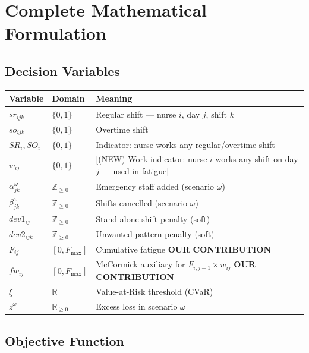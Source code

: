 \documentclass[12pt,a4paper]{article}
\newcommand{\contribbadge}{\colorbox{accentred}{\tiny\color{white}\textbf{OUR CONTRIBUTION}}\,}
\begin{document}
\section{Complete Mathematical Formulation}

\subsection{Decision Variables}

\begin{center}
\begin{tabularx}{\textwidth}{@{}llX@{}}
  \toprule
  \textbf{Variable} & \textbf{Domain} & \textbf{Meaning}\\
  \midrule
  $sr_{ijk}$         & $\{0,1\}$          & Regular shift — nurse $i$, day $j$, shift $k$\\
  $so_{ijk}$         & $\{0,1\}$          & Overtime shift\\
  $SR_i, SO_i$       & $\{0,1\}$          & Indicator: nurse works any regular/overtime shift\\
  $w_{ij}$           & $\{0,1\}$          & [(NEW) Work indicator: nurse $i$ works any shift on day $j$ — used in fatigue]\\
  $\alpha_{jk}^{\omega}$ & $\mathbb{Z}_{\geq 0}$ & Emergency staff added (scenario $\omega$)\\
  $\beta_{jk}^{\omega}$  & $\mathbb{Z}_{\geq 0}$ & Shifts cancelled (scenario $\omega$)\\
  $dev1_{ij}$        & $\mathbb{Z}_{\geq 0}$ & Stand-alone shift penalty (soft)\\
  $dev2_{ijk}$       & $\mathbb{Z}_{\geq 0}$ & Unwanted pattern penalty (soft)\\
  \rowcolor{palegreen}
  $F_{ij}$           & $[0,F_{\max}]$     & Cumulative fatigue \contribbadge\\
  \rowcolor{palegreen}
  $fw_{ij}$          & $[0,F_{\max}]$     & McCormick auxiliary for $F_{i,j-1} \times w_{ij}$ \contribbadge\\
  $\xi$              & $\mathbb{R}$       & Value-at-Risk threshold (CVaR)\\
  $z^{\omega}$       & $\mathbb{R}_{\geq 0}$ & Excess loss in scenario $\omega$\\
  \bottomrule
\end{tabularx}
\end{center}

\subsection{Objective Function}
\end{document}
